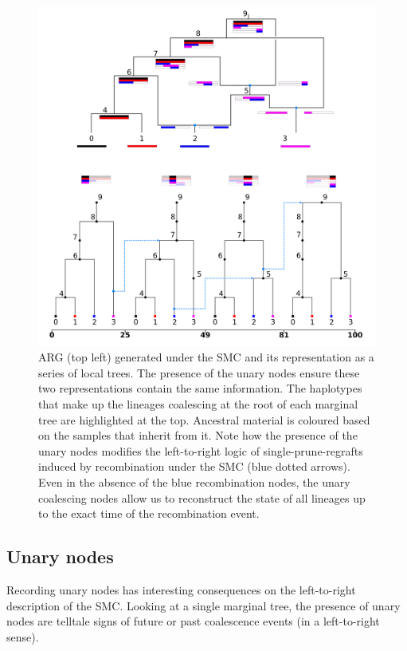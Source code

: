 \documentclass{article}
\begin{document}
\begin{figure}[!ht]
\centering
\includegraphics[width=\textwidth]{figures/smc_custom_2rows.png}
\caption{ARG (top left) generated under the SMC and its representation as a 
series of local trees. The presence of the unary nodes ensure these two 
representations contain the same information.
The haplotypes that make up the lineages coalescing 
at the root of each marginal tree are highlighted at the top. Ancestral 
material is coloured based on the samples that inherit from it.
Note how the presence of the unary nodes 
modifies the left-to-right logic of single-prune-regrafts induced by 
recombination under the SMC (blue dotted arrows).
Even in the absence of the blue recombination nodes, 
the unary coalescing nodes allow us to reconstruct the state of all lineages 
up to the exact time of the recombination event.
}
\label{fig:smc-unary}
\end{figure}

\subsection{Unary nodes} \label{par:unary}
Recording unary nodes has interesting consequences on the left-to-right 
description of the SMC. Looking at a single marginal tree, the presence of 
unary nodes are telltale signs of future or past coalescence events (in a 
left-to-right sense).\\
\end{document}
